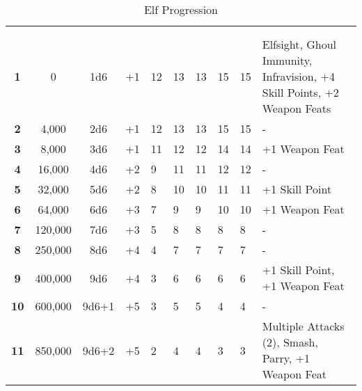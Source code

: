 \begin{multicols*}{2}

\end{multicols*}
\begin {table}[H]
  \caption{Elf Progression}
	\begin{tabularx}{\columnwidth}{>{\bfseries}cccM{.31in}M{.51in}M{.25in}M{.43in}M{.32in}M{.45in}Y}
    \thead{}&\thead{}&\thead{}&\thead{}&\thead{}&\setcounter{rownum}{0}\\
     &  &  &  &  &  &  &  &  & \\
		1 & 0 & 1d6 & +1 & 12 & 13 & 13 & 15 & 15 & Elfsight, Ghoul Immunity, Infravision, 
+4 Skill Points, +2 Weapon Feats\\
		2 & 4,000 & 2d6 & +1 & 12 & 13 & 13 & 15 & 15 & -\\
		3 & 8,000 & 3d6 & +1 & 11 & 12 & 12 & 14 & 14 & +1 Weapon Feat\\
		4 & 16,000 & 4d6 & +2 & 9 & 11 & 11 & 12 & 12 & -\\
		5 & 32,000 & 5d6 & +2 & 8 & 10 & 10 & 11 & 11 & +1 Skill Point\\
		6 & 64,000 & 6d6 & +3 & 7 & 9 & 9 & 10 & 10 & +1 Weapon Feat\\
		7 & 120,000 & 7d6 & +3 & 5 & 8 & 8 & 8 & 8 & -\\
		8 & 250,000 & 8d6 & +4 & 4 & 7 & 7 & 7 & 7 & -\\
		9 & 400,000 & 9d6 & +4 & 3 & 6 & 6 & 6 & 6 & +1 Skill Point, +1 Weapon Feat\\
		10 & 600,000 & 9d6+1 & +5 & 3 & 5 & 5 & 4 & 4 & -\\
		11 & 850,000 & 9d6+2 & +5 & 2 & 4 & 4 & 3 & 3 & Multiple Attacks (2), Smash, Parry, +1 Weapon Feat\\

\end{tabularx}
\end{table}
